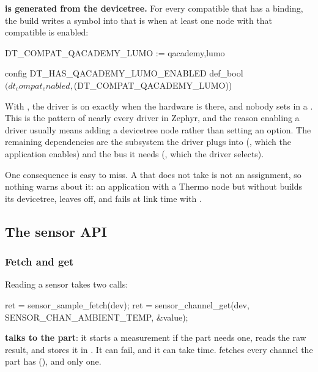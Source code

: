 \noindent \textbf{ is generated from the devicetree.} For every
compatible that has a binding, the build writes a symbol into  that
is  when at least one node with that compatible is enabled:

\begin{console}
DT_COMPAT_QACADEMY_LUMO := qacademy,lumo

config DT_HAS_QACADEMY_LUMO_ENABLED
	def_bool $(dt_compat_enabled,$(DT_COMPAT_QACADEMY_LUMO))
\end{console}

\noindent With , the driver is on exactly when the hardware is there, and nobody
sets  in a . This is the pattern of nearly every driver in
Zephyr, and the reason enabling a driver usually means adding a devicetree node rather than setting
an option. The remaining dependencies are the subsystem the driver plugs into (, which
the application enables) and the bus it needs (, which the driver selects).

One consequence is easy to miss. A  that does not take is not an assignment, so
nothing warns about it: an application with a Thermo node but without  builds
its devicetree, leaves  off, and fails at link time with .

\subsection{The sensor API}

\subsubsection{Fetch and get}
Reading a sensor takes two calls:

\begin{ccode}
ret = sensor_sample_fetch(dev);
ret = sensor_channel_get(dev, SENSOR_CHAN_AMBIENT_TEMP, &value);
\end{ccode}

\noindent \textbf{ talks to the part}: it starts a measurement if the part needs
one, reads the raw result, and stores it in . It can fail, and it can take time.
 fetches every channel the part has (), and
 only one.

